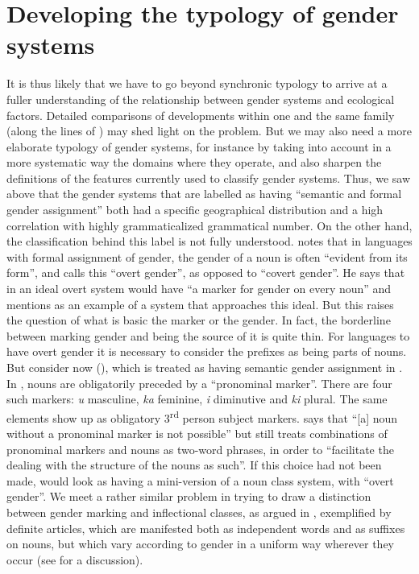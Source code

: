 \documentclass[output=collectionpaper]{langsci/langscibook}
\begin{document}
\section{Developing the typology of gender systems}

It is thus likely that we have to go beyond synchronic typology to arrive at a fuller understanding of the relationship between gender systems and ecological factors. Detailed comparisons of developments within one and the same family (along the lines of ) may shed light on the problem. But we may also need a more elaborate typology of gender systems, for instance by taking into account in a more systematic way the domains where they operate, and also sharpen the definitions of the features currently used to classify gender systems. Thus, we saw above that the gender systems that are labelled as having ``semantic and formal gender assignment'' both had a specific geographical distribution and a high correlation with highly grammaticalized grammatical number. On the other hand, the classification behind this label is not fully understood. \citet[62]{Corbett1991} notes that in languages with formal assignment of gender, the gender of a noun is often ``evident from its form'', and calls this ``overt gender'', as opposed to ``covert gender''. He says that in an ideal overt system would have ``a marker for gender on every noun'' and mentions  as an example of a system that approaches this ideal. But this raises the question of what is basic \textendash{} the marker or the gender. In fact, the borderline between marking gender and being the source of it is quite thin. For  languages to have overt gender it is necessary to consider the prefixes as being parts of nouns. But consider now  (), which is treated as having semantic gender assignment in \citet{Corbett2013b}.  In , nouns are obligatorily preceded by a ``pronominal marker''. There are four such markers: \textit{u} masculine, \textit{ka} feminine, \textit{i} diminutive and \textit{ki} plural. The same elements show up as obligatory 3\textsuperscript{rd} person subject markers. \citet[7]{Nagaraj1985} says that ``[a] noun without a pronominal marker is not possible'' but still treats combinations of pronominal markers and nouns as two-word phrases, in order to ``facilitate the dealing with the structure of the nouns as such''. If this choice had not been made,  would look as having a mini-version of a  noun class system, with ``overt gender''. We meet a rather similar problem in trying to draw a distinction between gender marking and inflectional classes, as argued in \citet{Dahl2000}, exemplified by  definite articles, which are manifested both as independent words and as suffixes on nouns, but which vary according to gender in a uniform way wherever they occur (see \citealt{Dahl2000} for a discussion).
\end{document}
